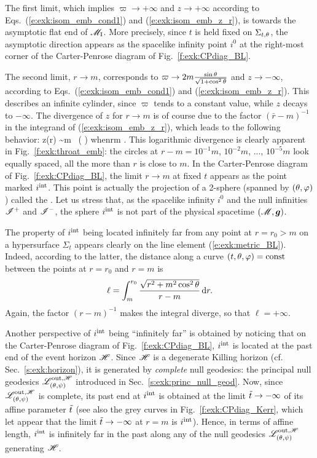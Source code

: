 The first limit, which implies $\varpi \to +\infty$ and $z \to +\infty$
according to Eqs.~(\ref{e:exk:isom_emb_cond1}) and (\ref{e:exk:isom_emb_z_r}),
is towards the asymptotic flat end of $\mathscr{M}_{\rm I}$.
More precisely, since $t$ is held fixed on $\Sigma_{t,\theta}$, the asymptotic
direction appears as the
spacelike infinity point $i^0$ at the right-most corner
of the Carter-Penrose diagram of Fig.~\ref{f:exk:CPdiag_BL}.

The second limit, $r\to m$, corresponds to
$\varpi \to 2m\frac{\sin\theta}{\sqrt{1 + \cos^2\theta}}$ and $z\to -\infty$,
according to Eqs.~(\ref{e:exk:isom_emb_cond1}) and (\ref{e:exk:isom_emb_z_r}).
This describes an infinite cylinder, since
$\varpi$ tends to a constant value, while $z$ decays to $-\infty$.
The divergence of $z$ for $r\to m$ is of course due to the
factor $(\bar{r} - m)^{-1}$ in the integrand of (\ref{e:exk:isom_emb_z_r}),
which leads to the following behavior:
\be
    z(r) \sim m  \, \ln \left(  \right)
    \quad\mbox{when}\quad r\to m .
\ee
This logarithmic divergence is clearly apparent in Fig.~\ref{f:exk:throat_emb}:
the circles at $r - m = 10^{-1} m$, $10^{-2} m$, ..., $10^{-5} m$ look
equally spaced, all the more than $r$ is close to $m$.
In the Carter-Penrose diagram of Fig.~\ref{f:exk:CPdiag_BL}, the limit $r\to m$
at fixed $t$ appears as the point marked $i^{\rm int}$. This point is actually
the projection of a 2-sphere (spanned by $(\theta,\varphi)$) called
the . Let us stress that, as the spacelike infinity $i^0$
and the null infinities $\mathscr{I}^+$ and $\mathscr{I}^-$, the sphere $i^{\rm int}$
is not part of the physical spacetime $(\mathscr{M},\bm{g})$.

The property of $i^{\rm int}$ being located infinitely far from any point at $r=r_0>m$ on
a hypersurface $\Sigma_t$ appears clearly
on the line element (\ref{e:exk:metric_BL}). Indeed,
according to the latter, the distance along a
curve $(t,\theta,\varphi)=\mathrm{const}$ between the points
at $r=r_0$ and $r=m$ is
\[
    \ell = \int_{m}^{r_0} \frac{\sqrt{r^2 + m^2\cos^2\theta}}{r - m} \, \mathrm{d} r .
\]
Again, the factor $(r - m)^{-1}$ makes the integral diverge, so that $\ell = +\infty$.

Another perspective of $i^{\rm int}$ being ``infinitely far'' is obtained by noticing
that on the Carter-Penrose diagram of Fig.~\ref{f:exk:CPdiag_BL},
$i^{\rm int}$ is located at the past end of the event horizon $\mathscr{H}$. Since
$\mathscr{H}$ is a degenerate Killing horizon (cf. Sec.~\ref{s:exk:horizon}), it is generated by
\emph{complete} null geodesics: the principal null geodesics $\mathscr{L}^{{\rm out},\mathscr{H}}_{(\theta,\psi)}$
introduced in Sec.~\ref{s:exk:princ_null_geod}. Now, since
$\mathscr{L}^{{\rm out},\mathscr{H}}_{(\theta,\psi)}$ is complete, its past end at $i^{\rm int}$ is obtained at the limit ${\tilde t}\to -\infty$ of its
affine parameter ${\tilde t}$ (see also the grey curves in Fig.~\ref{f:exk:CPdiag_Kerr}, which let appear that
the limit ${\tilde t}\to -\infty$ at $r=m$ is
$i^{\rm int}$). Hence, in terms of affine length, $i^{\rm int}$ is infinitely
far in the past along any of the null geodesics $\mathscr{L}^{{\rm out},\mathscr{H}}_{(\theta,\psi)}$
generating $\mathscr{H}$.

